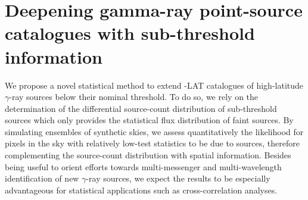 %
\chapter{Deepening gamma-ray point-source catalogues with sub-threshold information}
\label{ch:dnds_catalog}

We propose a novel statistical method to extend \Fermi-LAT catalogues of high-latitude $\gamma$-ray sources below their nominal threshold.
To do so, we rely on the determination of the differential source-count distribution of sub-threshold sources which only provides the statistical flux distribution of faint sources.
By simulating ensembles of synthetic skies, we assess quantitatively the likelihood for pixels in the sky with relatively low-test statistics to be due to sources, therefore complementing the source-count distribution with spatial information.
Besides being useful to orient efforts towards multi-messenger and multi-wavelength  identification of new $\gamma$-ray sources, we expect the results to be especially advantageous for statistical applications such as cross-correlation analyses.






